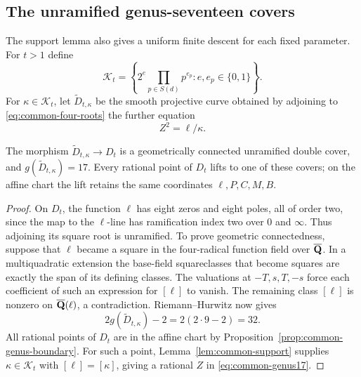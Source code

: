 \subsection{The unramified genus-seventeen covers}

The support lemma also gives a uniform finite descent for each fixed
parameter.  For $t>1$ define
\[
 \mathcal K_t=\left\{2^e\prod_{p\in S(d)}p^{e_p}:
                         e,e_p\in\{0,1\}\right\}.
\]
For $\kappa\in\mathcal K_t$, let $\widetilde D_{t,\kappa}$ be the
smooth projective curve obtained by adjoining to
\eqref{eq:common-four-roots} the further equation
\begin{equation}\label{eq:common-genus17}
 Z^2=\ell/\kappa.
\end{equation}

\begin{proposition}\label{prop:common-genus17}
The morphism $\widetilde D_{t,\kappa}\to D_t$ is a geometrically
connected unramified double cover, and
$g(\widetilde D_{t,\kappa})=17$.  Every rational point of $D_t$ lifts
to one of these covers; on the affine chart the lift retains the same
coordinates $\ell,P,C,M,B$.
\end{proposition}
\begin{proof}
On $D_t$, the function $\ell$ has eight zeros and eight poles, all of order
two, since the map to the $\ell$-line has ramification index two over
$0$ and $\infty$.  Thus adjoining its square root is unramified.
To prove geometric connectedness, suppose that $\ell$ became a square in
the four-radical function field over $\overline{\mathbf Q}$.  In a
multiquadratic extension the base-field squareclasses that become
squares are exactly the span of its defining classes.
The valuations at $-T,s,T,-s$ force each coefficient of such an
expression for $[\ell]$ to vanish.  The remaining class $[\ell]$ is nonzero
on $\overline{\mathbf Q}(\ell)$, a contradiction.  Riemann--Hurwitz now gives
\[
 2g(\widetilde D_{t,\kappa})-2=2(2\cdot9-2)=32.
\]
All rational points of $D_t$ are in the affine chart by
Proposition~\ref{prop:common-genus-boundary}.  For such a point,
Lemma~\ref{lem:common-support} supplies $\kappa\in\mathcal K_t$ with
$[\ell]=[\kappa]$, giving a rational $Z$ in
\eqref{eq:common-genus17}.
\end{proof}

